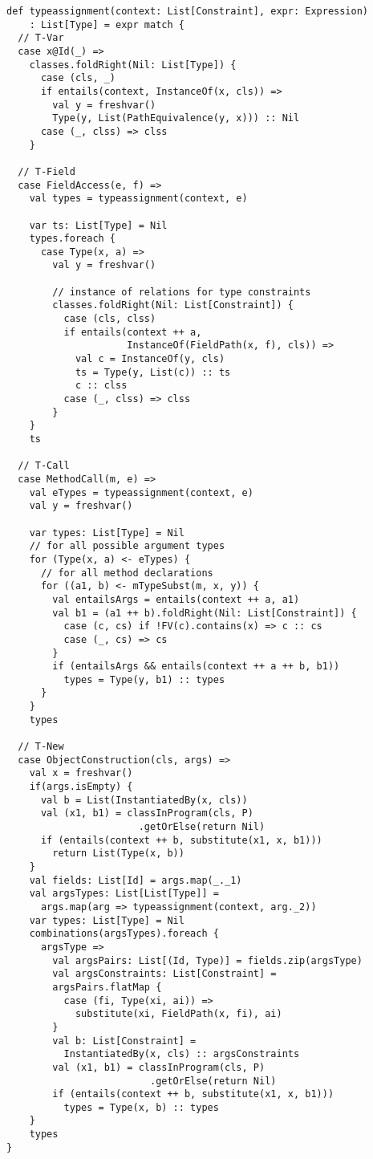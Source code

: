 %
\begin{lstlisting}[caption={Type Assignment},label=lst:typeass,captionpos=b,frame={lines}]
def typeassignment(context: List[Constraint], expr: Expression)
    : List[Type] = expr match {
  // T-Var
  case x@Id(_) =>
    classes.foldRight(Nil: List[Type]) {
      case (cls, _)
      if entails(context, InstanceOf(x, cls)) =>
        val y = freshvar()
        Type(y, List(PathEquivalence(y, x))) :: Nil
      case (_, clss) => clss
    }
    
  // T-Field
  case FieldAccess(e, f) =>
    val types = typeassignment(context, e)

    var ts: List[Type] = Nil
    types.foreach {
      case Type(x, a) =>
        val y = freshvar()

        // instance of relations for type constraints
        classes.foldRight(Nil: List[Constraint]) {
          case (cls, clss)
          if entails(context ++ a,
                     InstanceOf(FieldPath(x, f), cls)) =>
            val c = InstanceOf(y, cls)
            ts = Type(y, List(c)) :: ts
            c :: clss
          case (_, clss) => clss
        }
    }
    ts
    
  // T-Call
  case MethodCall(m, e) =>
    val eTypes = typeassignment(context, e)
    val y = freshvar()

    var types: List[Type] = Nil
    // for all possible argument types
    for (Type(x, a) <- eTypes) {
      // for all method declarations
      for ((a1, b) <- mTypeSubst(m, x, y)) {
        val entailsArgs = entails(context ++ a, a1)
        val b1 = (a1 ++ b).foldRight(Nil: List[Constraint]) {
          case (c, cs) if !FV(c).contains(x) => c :: cs
          case (_, cs) => cs
        }
        if (entailsArgs && entails(context ++ a ++ b, b1))
          types = Type(y, b1) :: types
      }
    }
    types
    
  // T-New
  case ObjectConstruction(cls, args) =>
    val x = freshvar()
    if(args.isEmpty) {
      val b = List(InstantiatedBy(x, cls))
      val (x1, b1) = classInProgram(cls, P)
                       .getOrElse(return Nil)
      if (entails(context ++ b, substitute(x1, x, b1)))
        return List(Type(x, b))
    }
    val fields: List[Id] = args.map(_._1)
    val argsTypes: List[List[Type]] =
      args.map(arg => typeassignment(context, arg._2))
    var types: List[Type] = Nil
    combinations(argsTypes).foreach {
      argsType =>
        val argsPairs: List[(Id, Type)] = fields.zip(argsType)
        val argsConstraints: List[Constraint] =
        argsPairs.flatMap {
          case (fi, Type(xi, ai)) =>
            substitute(xi, FieldPath(x, fi), ai)
        }
        val b: List[Constraint] =
          InstantiatedBy(x, cls) :: argsConstraints
        val (x1, b1) = classInProgram(cls, P)
                         .getOrElse(return Nil)
        if (entails(context ++ b, substitute(x1, x, b1)))
          types = Type(x, b) :: types
    }
    types
}
\end{lstlisting}
